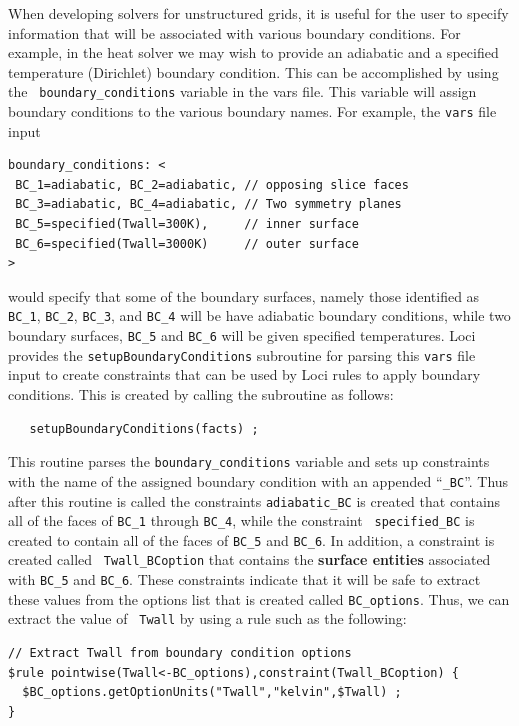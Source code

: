 \documentclass[10pt,epsf,letterpaper,twoside]{book}
\begin{document}
When developing solvers for unstructured grids, it is useful for the
user to specify information that will be associated with various
boundary conditions.  For example, in the heat solver we may wish to
provide an adiabatic and a specified temperature (Dirichlet) boundary
condition.  This can be accomplished by using the {\tt
  boundary\_conditions} variable in the vars file.  This variable will
assign boundary conditions to the various boundary names.  For
example, the {\tt vars} file input
\begin{verbatim}
boundary_conditions: <
 BC_1=adiabatic, BC_2=adiabatic, // opposing slice faces
 BC_3=adiabatic, BC_4=adiabatic, // Two symmetry planes
 BC_5=specified(Twall=300K),     // inner surface
 BC_6=specified(Twall=3000K)     // outer surface
>
\end{verbatim}
would specify that some of the boundary surfaces, namely those
identified as {\tt BC\_1}, {\tt BC\_2}, {\tt BC\_3}, and {\tt BC\_4}
will be have adiabatic boundary conditions, while two boundary
surfaces, {\tt BC\_5} and {\tt BC\_6} will be given specified
temperatures.  Loci provides the {\tt setupBoundaryConditions}
subroutine for parsing this {\tt vars} file input to create
constraints that can be used by Loci rules to apply boundary
conditions.  This is created by calling the subroutine as follows:
\begin{verbatim}
   setupBoundaryConditions(facts) ;
\end{verbatim}
This routine parses the {\tt boundary\_conditions} variable and sets
up constraints with the name of the assigned boundary condition with
an appended ``{\tt \_BC}''.  Thus after this routine is called the
constraints {\tt adiabatic\_BC} is created that contains all of the
faces of {\tt BC\_1} through {\tt BC\_4}, while the constraint {\tt
  specified\_BC} is created to contain all of the faces of {\tt BC\_5}
and {\tt BC\_6}.  In addition, a constraint is created called {\tt
  Twall\_BCoption} that contains the {\bf surface entities} associated with
{\tt BC\_5} and {\tt BC\_6}.  These constraints indicate that it will
be safe to extract these values from the options list that is created
called {\tt BC\_options}.  Thus, we can extract the value of {\tt
  Twall} by using a rule such as the following:
\newpage
\begin{verbatim}
// Extract Twall from boundary condition options
$rule pointwise(Twall<-BC_options),constraint(Twall_BCoption) {
  $BC_options.getOptionUnits("Twall","kelvin",$Twall) ;
}
\end{verbatim}
\end{document}
